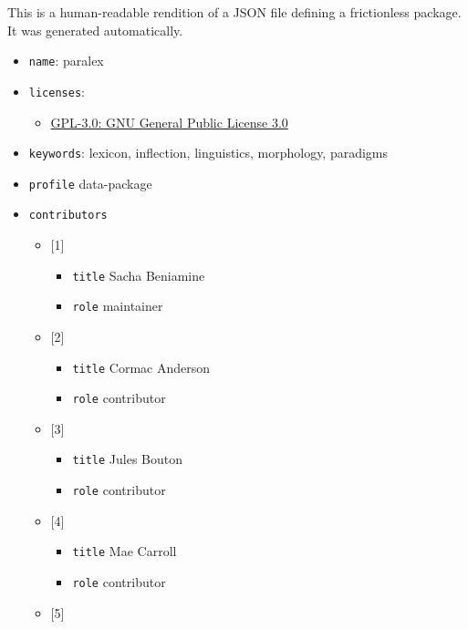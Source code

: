 
This is a human-readable rendition of a JSON file defining a
frictionless package. It was generated automatically.

\begin{itemize}
\item
  \texttt{name}: paralex
\item
  \texttt{licenses}:

  \begin{itemize}
  \tightlist
  \item
    \href{https://opensource.org/licenses/GPL-3.0}{GPL-3.0: GNU General
    Public License 3.0}
  \end{itemize}
\item
  \texttt{keywords}: lexicon, inflection, linguistics, morphology,
  paradigms
\item
  \texttt{profile} data-package
\item
  \texttt{contributors}

  \begin{itemize}
  \tightlist
  \item
    {[}1{]}

    \begin{itemize}
    \tightlist
    \item
      \texttt{title} Sacha Beniamine
    \item
      \texttt{role} maintainer
    \end{itemize}
  \item
    {[}2{]}

    \begin{itemize}
    \tightlist
    \item
      \texttt{title} Cormac Anderson
    \item
      \texttt{role} contributor
    \end{itemize}
  \item
    {[}3{]}

    \begin{itemize}
    \tightlist
    \item
      \texttt{title} Jules Bouton
    \item
      \texttt{role} contributor
    \end{itemize}
  \item
    {[}4{]}

    \begin{itemize}
    \tightlist
    \item
      \texttt{title} Mae Carroll
    \item
      \texttt{role} contributor
    \end{itemize}
  \item
    {[}5{]}


\end{itemize}
\end{itemize}
